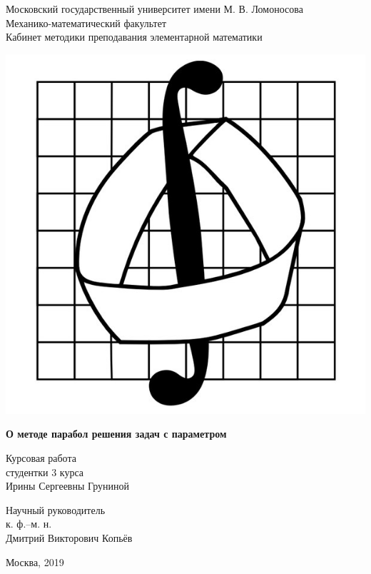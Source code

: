 \thispagestyle {empty}

\begin {center}
    Московский государственный университет имени М. В. Ломоносова \\
    Механико-математический факультет \\
    Кабинет методики преподавания элементарной математики
\end {center}

\vspace*{\fill}

\begin {center}
    \includegraphics [width = 0.3 \textwidth] {image/mm-logo.jpg}
\end {center}

\vspace*{\fill}

\begin {center}
    \LARGE{\textbf{О методе парабол решения задач с параметром}}
\end {center}

\vspace*{\fill}

\begin {center}
    Курсовая работа \\
    студентки 3 курса \\
    Ирины Сергеевны Груниной
\end {center}

\vspace*{\fill}

\begin {flushright}
    Научный руководитель \\
    к. ф.--м. н.\\
    Дмитрий Викторович Копьёв
\end {flushright}

\vspace*{\fill}

\begin {center}
    Москва, 2019
\end {center}

\pagebreak